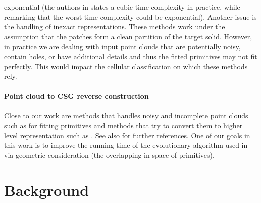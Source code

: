 exponential (the authors in \cite{buchele2004three} states a cubic 
time complexity in practice, while remarking that the worst time complexity could be exponential). 
Another issue is the handling of inexact representations. 
These methods work under the assumption that the patches form a clean partition of the 
target solid. However, in practice we are dealing with input point clouds that are potentially 
noisy, contain holes, or have additional details and thus the fitted primitives may not fit perfectly. 
This would impact the cellular classification on which these methods rely. 

\paragraph{Point cloud to CSG reverse construction}
Close to our work are methods that handles noisy and incomplete point clouds 
such as \cite{schnabel2007efficient} for fitting primitives and methods that try to convert them to higher level representation such as \cite{fayolle2016evolutionary}. See also \cite[Sections~7 and 8]{berger2017survey} for further references. 
One of our goals in this work is to improve the running time of the evolutionary algorithm used in \cite{fayolle2016evolutionary} via geometric consideration (the overlapping in space of primitives).

\section{Background}
